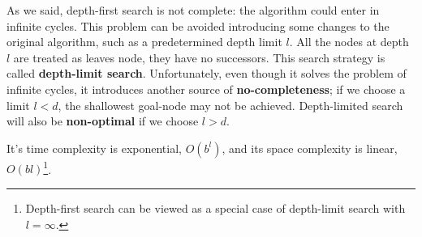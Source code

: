 As we said, depth-first search is not complete: the algorithm could enter in infinite cycles. This problem can be avoided introducing some changes to the original algorithm, such as
a predetermined depth limit $l$. All the nodes at depth $l$ are treated as leaves node, they have no successors. This search strategy is called \textbf{depth-limit search}.
Unfortunately, even though it solves the problem of infinite cycles, it introduces another source of \textbf{no-completeness}; if we choose a limit $l < d$, the shallowest goal-node
may not be achieved. Depth-limited search will also be \textbf{non-optimal} if we choose $l > d$. \vspace{3.5pt}

It's time complexity is exponential, $O(b^l)$, and its space complexity is linear, $O(bl)$\footnote{Depth-first search can be viewed as a special case of depth-limit search with $l=\infty$.}.
